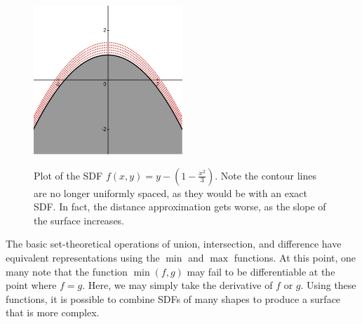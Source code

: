 \documentclass{article}
\begin{document}
\begin{figure}
\caption{Plot of the SDF $f\left(x,y\right) = y - \left(1 - \frac{x^2}{3}\right)$. Note the contour lines are no longer uniformly spaced, as they would be with an exact SDF. In fact, the distance approximation gets worse, as the slope of the surface increases.}
\includegraphics[width=0.5\textwidth]{Hill_SDF}
\label{fig:Hill_SDF}
\end{figure}

The basic set-theoretical operations of union, intersection, and difference have equivalent representations using the $\min$ and $\max$ functions. At this point, one many note that the function $\min\left(f,g\right)$ may fail to be differentiable at the point where $f = g$. Here, we may simply take the derivative of $f$ or $g$. Using these functions, it is possible to combine SDFs of many shapes to produce a surface that is more complex.
\end{document}
